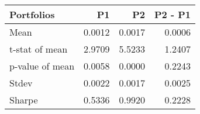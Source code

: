 \begin{tabular}{lrrr}
\toprule
Portfolios & P1 & P2 & P2 - P1 \\
\midrule
Mean & 0.0012 & 0.0017 & 0.0006 \\
t-stat of mean & 2.9709 & 5.5233 & 1.2407 \\
p-value of mean & 0.0058 & 0.0000 & 0.2243 \\
Stdev & 0.0022 & 0.0017 & 0.0025 \\
Sharpe & 0.5336 & 0.9920 & 0.2228 \\
\bottomrule
\end{tabular}
